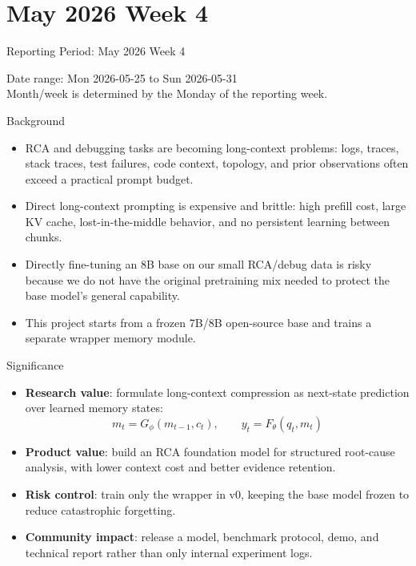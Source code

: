 
\section{May 2026 Week 4}

\begin{frame}{Reporting Period: May 2026 Week 4}
  \begin{center}
    \small Date range: Mon 2026-05-25 to Sun 2026-05-31 \\
    \scriptsize Month/week is determined by the Monday of the reporting week.
  \end{center}
\end{frame}

\begin{frame}{Background}
  \begin{itemize}
    \item RCA and debugging tasks are becoming long-context problems: logs, traces, stack traces, test failures, code context, topology, and prior observations often exceed a practical prompt budget.
    \item Direct long-context prompting is expensive and brittle: high prefill cost, large KV cache, lost-in-the-middle behavior, and no persistent learning between chunks.
    \item Directly fine-tuning an 8B base on our small RCA/debug data is risky because we do not have the original pretraining mix needed to protect the base model's general capability.
    \item This project starts from a frozen 7B/8B open-source base and trains a separate wrapper memory module.
  \end{itemize}
\end{frame}

\begin{frame}{Significance}
  \begin{itemize}
    \item \textbf{Research value}: formulate long-context compression as next-state prediction over learned memory states:
      \[
        m_t = G_\phi(m_{t-1}, c_t), \qquad y_t = F_\theta(q_t, m_t)
      \]
    \item \textbf{Product value}: build an RCA foundation model for structured root-cause analysis, with lower context cost and better evidence retention.
    \item \textbf{Risk control}: train only the wrapper in v0, keeping the base model frozen to reduce catastrophic forgetting.
    \item \textbf{Community impact}: release a model, benchmark protocol, demo, and technical report rather than only internal experiment logs.
  \end{itemize}
\end{frame}

